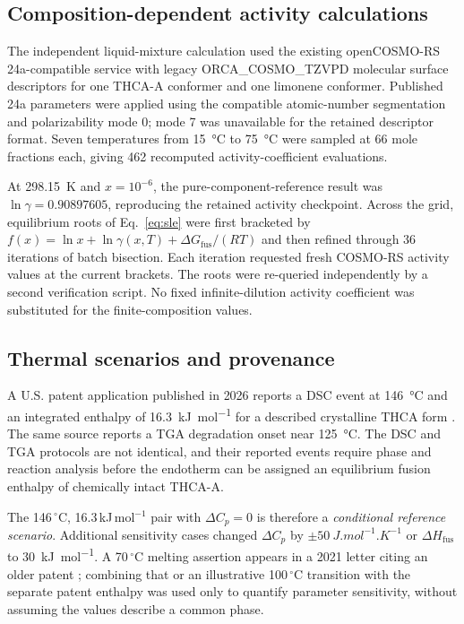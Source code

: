 \documentclass[10pt,a4paper,twocolumn]{article}
\begin{document}
\subsection{Composition-dependent activity calculations}
The independent liquid-mixture calculation used the existing openCOSMO-RS 24a-compatible service with legacy ORCA\_COSMO\_TZVPD molecular surface descriptors for one THCA-A conformer and one limonene conformer. Published 24a parameters \cite{muller} were applied using the compatible atomic-number segmentation and polarizability mode 0; mode 7 was unavailable for the retained descriptor format. Seven temperatures from \SI{15}{\celsius} to \SI{75}{\celsius} were sampled at 66 mole fractions each, giving 462 recomputed activity-coefficient evaluations.

At \SI{298.15}{K} and $x=10^{-6}$, the pure-component-reference result was $\ln\gamma=0.90897605$, reproducing the retained activity checkpoint. Across the grid, equilibrium roots of Eq.~\ref{eq:sle} were first bracketed by $f(x)=\ln x+\ln\gamma(x,T)+\Delta G_{\mathrm{fus}}/(RT)$ and then refined through 36 iterations of batch bisection. Each iteration requested fresh COSMO-RS activity values at the current brackets. The roots were re-queried independently by a second verification script. No fixed infinite-dilution activity coefficient was substituted for the finite-composition values.

\subsection{Thermal scenarios and provenance}
A U.S. patent application published in 2026 reports a DSC event at \SI{146}{\celsius} and an integrated enthalpy of \SI{16.3}{kJ.mol^{-1}} for a described crystalline THCA form \cite{patent}. The same source reports a TGA degradation onset near \SI{125}{\celsius}. The DSC and TGA protocols are not identical, and their reported events require phase and reaction analysis before the endotherm can be assigned an equilibrium fusion enthalpy of chemically intact THCA-A.

The 146\,$^\circ$C, 16.3\,kJ\,mol$^{-1}$ pair with $\Delta C_p=0$ is therefore a \emph{conditional reference scenario}. Additional sensitivity cases changed $\Delta C_p$ by $\pm\SI{50}{J.mol^{-1}.K^{-1}}$ or $\Delta H_{\mathrm{fus}}$ to \SI{30}{kJ.mol^{-1}}. A 70\,$^\circ$C melting assertion appears in a 2021 letter citing an older patent \cite{filer}; combining that or an illustrative 100\,$^\circ$C transition with the separate patent enthalpy was used only to quantify parameter sensitivity, without assuming the values describe a common phase.
\end{document}
